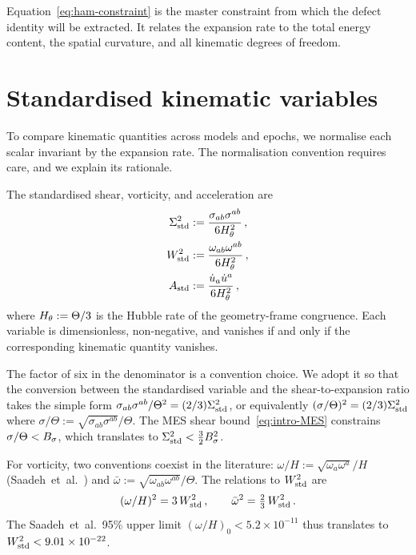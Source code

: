 Equation~\eqref{eq:ham-constraint} is the master constraint
from which the defect identity will be extracted.  It relates
the expansion rate to the total energy content, the spatial
curvature, and all kinematic degrees of freedom.


\section{Standardised kinematic variables}\label{sec:std-vars}

To compare kinematic quantities across models and epochs, we
normalise each scalar invariant by the expansion rate.  The
normalisation convention requires care, and we explain its
rationale.

\begin{definition}\label{def:std-vars}
The standardised shear, vorticity, and acceleration are
\begin{align}
\Sigma^2_{\mathrm{std}} &:= \frac{\sigma_{ab}\sigma^{ab}}{6H_\theta^2}\,,
\label{eq:Sigstd-def}\\
W^2_{\mathrm{std}}   &:= \frac{\omega_{ab}\omega^{ab}}{6H_\theta^2}\,,
\label{eq:Wstd-def}\\
A_{\mathrm{std}}   &:= \frac{\dot{u}_a\dot{u}^a}{6H_\theta^2}\,,
\label{eq:Astd-def}
\end{align}
where $H_\theta := \Theta/3$ is the Hubble rate of the
geometry-frame congruence.  Each variable is dimensionless,
non-negative, and vanishes if and only if the corresponding
kinematic quantity vanishes.
\end{definition}

The factor of six in the denominator is a convention choice.
We adopt it so that the conversion between the standardised
variable and the shear-to-expansion ratio takes the simple form
$\sigma_{ab}\sigma^{ab}/\Theta^2 = (2/3)\Sigma^2_{\mathrm{std}}$, or
equivalently $(\sigma/\Theta)^2 = (2/3)\Sigma^2_{\mathrm{std}}$ where
$\sigma/\Theta := \sqrt{\sigma_{ab}\sigma^{ab}}/\Theta$.
The MES shear bound~\eqref{eq:intro-MES} constrains
$\sigma/\Theta < B_\sigma$, which translates to
$\Sigma^2_{\mathrm{std}} < \tfrac{3}{2}B_\sigma^2$.

For vorticity, two conventions coexist in the literature:
$\omega/H := \sqrt{\omega_a\omega^a}/H$
(Saadeh~et~al.~\cite{Saadeh2016b}) and
$\bar{\omega} := \sqrt{\omega_{ab}\omega^{ab}}/\Theta$.
The relations to $W^2_{\mathrm{std}}$ are
\begin{equation}\label{eq:omH-W2}
(\omega/H)^2 = 3\,W^2_{\mathrm{std}}\,,\qquad
\bar{\omega}^2 = \tfrac{2}{3}\,W^2_{\mathrm{std}}\,.
\end{equation}
The Saadeh~et~al.\ 95\% upper limit
$(\omega/H)_0 < 5.2 \times 10^{-11}$ thus translates to
$W^2_{\mathrm{std}} < 9.01 \times 10^{-22}$.


